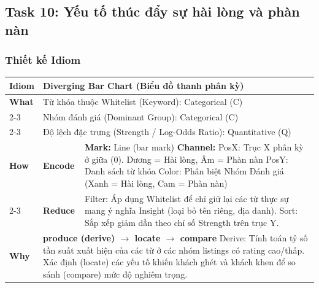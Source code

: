 \subsection{Task 10: Yếu tố thúc đẩy sự hài lòng và phàn nàn}

\subsubsection{Thiết kế Idiom}

\begin{table}[H]
\centering
\renewcommand{\arraystretch}{1.1}
\begin{tabularx}{\textwidth}{|l|l|X|}
\hline
\textbf{Idiom} & \multicolumn{2}{l|}{\textbf{Diverging Bar Chart (Biểu đồ thanh phân kỳ)}} \\ \hline
\textbf{What}
& \multicolumn{2}{X|}{Từ khóa thuộc Whitelist (Keyword): Categorical (C)} \\ \cline{2-3}
& \multicolumn{2}{X|}{Nhóm đánh giá (Dominant Group): Categorical (C)} \\ \cline{2-3}
& \multicolumn{2}{X|}{Độ lệch đặc trưng (Strength / Log-Odds Ratio): Quantitative (Q)} \\ \hline
\textbf{How}
& \textbf{Encode} &
\textbf{Mark:} Line (bar mark) \newline
\textbf{Channel:} \newline
\hspace*{1em} PosX: Trục X phân kỳ ở giữa (0). Dương = Hài lòng, Âm = Phàn nàn \newline
\hspace*{1em} PosY: Danh sách từ khóa \newline
\hspace*{1em} Color: Phân biệt Nhóm Đánh giá (Xanh = Hài lòng, Cam = Phàn nàn) \\ \cline{2-3}
& \textbf{Reduce} &
Filter: Áp dụng Whitelist để chỉ giữ lại các từ thực sự mang ý nghĩa Insight (loại bỏ tên riêng, địa danh). \newline
Sort: Sắp xếp giảm dần theo chỉ số Strength trên trục Y. \\ \hline
\textbf{Why} & \multicolumn{2}{X|}{
\textbf{produce (derive) $\rightarrow$ locate $\rightarrow$ compare} \newline
Derive: Tính toán tỷ số tần suất xuất hiện của các từ ở các nhóm listings có rating cao/thấp. Xác định (locate) các yếu tố khiến khách ghét và khách khen để so sánh (compare) mức độ nghiêm trọng.
} \\ \hline
\end{tabularx}
\end{table}

